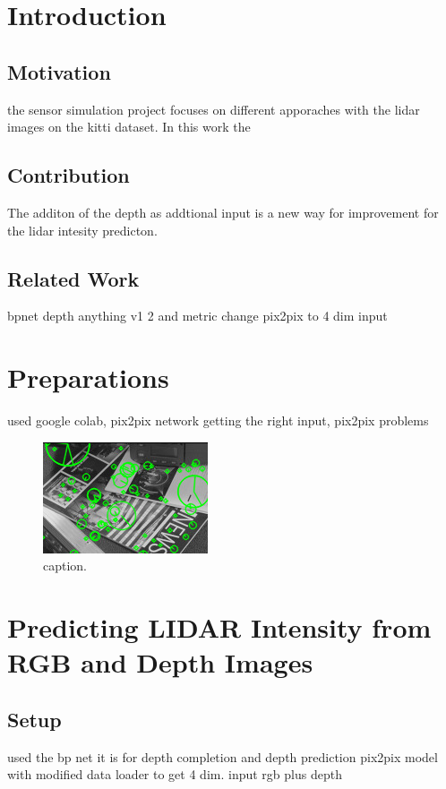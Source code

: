 \chapter{Introduction}
\label{chap:intro}

\section{Motivation}
\label{sect:motivation}
the sensor simulation project focuses on different apporaches with the lidar images on the kitti dataset. In this work the 
\section{Contribution}
The additon of the depth as addtional input is a new way for improvement for the lidar intesity predicton.
\section{Related Work}
bpnet depth anything v1 2 and metric change pix2pix to 4 dim input
\chapter{Preparations}
used google colab, pix2pix network getting the right input, pix2pix problems
\begin{figure}[!ht]
	\centering
	\includegraphics[width=0.9\linewidth]{image.jpg}
	\caption{caption.}
	\label{img:example}
\end{figure}
\chapter{Predicting LIDAR Intensity from RGB and Depth Images}
\section{Setup}
used the bp net it is for depth completion and depth prediction
pix2pix model with modified data loader to get 4 dim. input rgb plus depth
